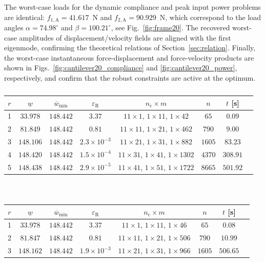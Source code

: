 \documentclass[preprint,3p]{elsarticle}
\newcommand{\A}{\mathrm{A}}
\newcommand{\R}{\mathrm{R}}
\numberwithin{equation}{section}
\begin{document}
The worst-case loads for the dynamic compliance and peak input power problems are identical: $f_{1,\A} = 41.617$~N and $f_{2,\A} = 90.929$~N, which correspond to the load angles $\alpha = 74.98^\circ$ and $\beta = 100.21^\circ$, see Fig.~\ref{fig:frame20}. The recovered worst-case amplitudes of displacement/velocity fields are aligned with the first eigenmode, confirming the theoretical relations of Section~\ref{sec:relation}. Finally, the worst-case instantaneous force-displacement and force-velocity products are shown in Figs.~\ref{fig:cantilever20_compliance} and \ref{fig:cantilever20_power}, respectively, and confirm that the robust constraints are active at the optimum.

\begin{table}[!t]
\centering
\begin{subtable}{\linewidth}
\centering
\begin{tabular}{cccccccc}
$r$ & $\underline{w}$ & $\overline{w}_{\min}$ & $\varepsilon_\R$ & $n_\mathrm{c} \times m$ & $n$ & $t$ [s]\\
\hline 1 & $33.978$ & $148.442$ & $3.37$ & $11\times 1$, $1\times11$, $1\times 42$ & $65$ & $0.09$ \\
2 & $81.849$ & $148.442$ & $0.81$ & $11\times 11$, $1\times 21$, $1\times 462$ & $790$ & $9.00$\\
3 & $148.106$ & $148.442$ & $2.3\times 10^{-3}$ & $11\times21$, $1\times31$, $1\times882$ & $1605$ & $83.23$\\
4 & $148.420$ & $148.442$ & $1.5\times 10^{-4}$ & $11\times31$, $1\times41$, $1\times1302$ & $4370$ & $308.91$\\
5 & $148.438$ & $148.442$ & $2.9\times 10^{-5}$ & $11\times41$, $1\times51$, $1\times1722$ & $8665$ & $501.92$
\end{tabular}
\caption{}
\label{tab:frame20_fv}
\end{subtable}\\
\begin{subtable}{\linewidth}
\centering
\begin{tabular}{cccccccc}
$r$ & $\underline{w}$ & $\overline{w}_{\min}$ & $\varepsilon_\R$ & $n_\mathrm{c} \times m$ & $n$ & $t$ [s]\\
\hline 1 & $33.978$ & $148.442$ & $3.37$ & $11\times 1$, $1\times11$, $1\times 46$ & $65$ & $0.08$ \\
2 & $81.847$ & $148.442$ & $0.81$ & $11\times 11$, $1\times 21$, $1\times 506$ & $790$ & $10.99$\\
3 & $148.162$ & $148.442$ & $1.9\times 10^{-3}$ & $11\times21$, $1\times31$, $1\times966$ & $1605$ & $506.65$\\

\end{tabular}
\end{subtable}
\end{table}
\end{document}

